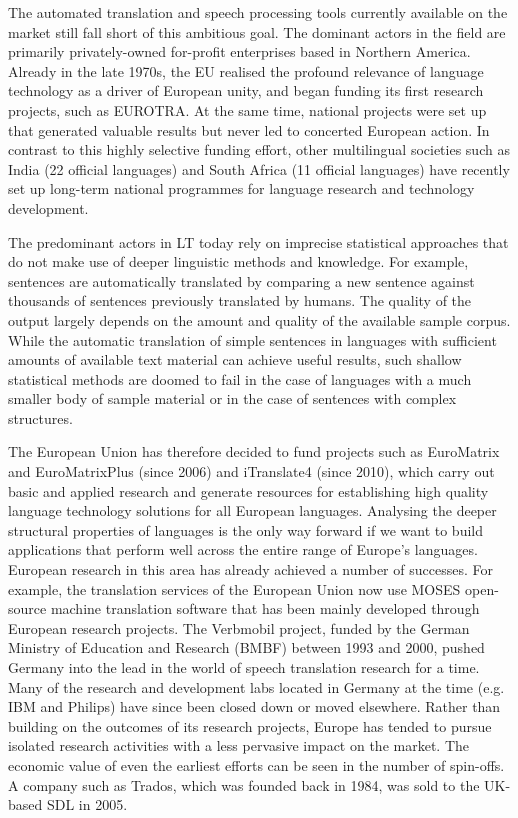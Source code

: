 \begin{multicols}{2}
    The automated translation and speech processing tools currently available on the market still fall short of this ambitious goal. The dominant actors in the field are primarily privately-owned for-profit enterprises based in Northern America. Already in the late 1970s, the EU realised the profound relevance of language technology as a driver of European unity, and began funding its first research projects, such as EUROTRA. At the same time, national projects were set up that generated valuable results but never led to concerted European action. In contrast to this highly selective funding effort, other multilingual societies such as India (22 official languages) and South Africa (11 official languages) have recently set up long-term national programmes for language research and technology development. 

    The predominant actors in LT today rely on imprecise statistical approaches that do not make use of deeper linguistic methods and knowledge. For example, sentences are automatically translated by comparing a new sentence against thousands of sentences previously translated by humans. The quality of the output largely depends on the amount and quality of the available sample corpus. While the automatic translation of simple sentences in languages with sufficient amounts of available text material can achieve useful results, such shallow statistical methods are doomed to fail in the case of languages with a much smaller body of sample material or in the case of sentences with complex structures.


    The European Union has therefore decided to fund projects such as EuroMatrix and EuroMatrixPlus (since 2006) and iTranslate4 (since 2010), which carry out basic and applied research and generate resources for establishing high quality language technology solutions for all European languages. Analysing the deeper structural properties of languages is the only way forward if we want to build applications that perform well across the entire range of Europe’s languages.
    European research in this area has already achieved a number of successes. For example, the translation services of the European Union now use MOSES open-source machine translation software that has been mainly developed through European research projects. The Verbmobil project, funded by the German Ministry of Education and Research (BMBF) between 1993 and 2000, pushed Germany into the lead in the world of speech translation research for a time. Many of the research and development labs located in Germany at the time (e.g. IBM and Philips) have since been closed down or moved elsewhere. Rather than building on the outcomes of its research projects, Europe has tended to pursue isolated research activities with a less pervasive impact on the market. The economic value of even the earliest efforts can be seen in the number of spin-offs. A company such as Trados, which was founded back in 1984, was sold to the UK-based SDL in 2005.


\end{multicols}
